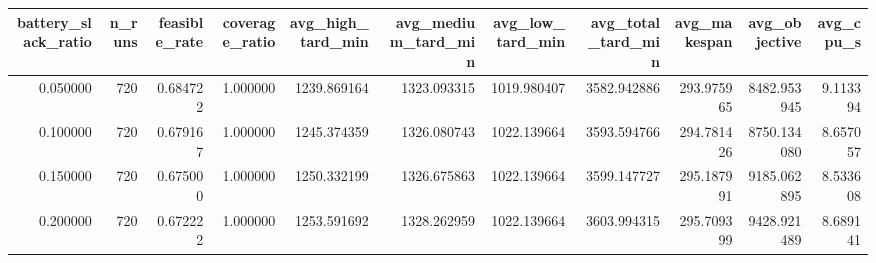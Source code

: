 \begin{tabular}{rrrrrrrrrrr}
\toprule
battery_slack_ratio & n_runs & feasible_rate & coverage_ratio & avg_high_tard_min & avg_medium_tard_min & avg_low_tard_min & avg_total_tard_min & avg_makespan & avg_objective & avg_cpu_s \\
\midrule
0.050000 & 720 & 0.684722 & 1.000000 & 1239.869164 & 1323.093315 & 1019.980407 & 3582.942886 & 293.975965 & 8482.953945 & 9.113394 \\
0.100000 & 720 & 0.679167 & 1.000000 & 1245.374359 & 1326.080743 & 1022.139664 & 3593.594766 & 294.781426 & 8750.134080 & 8.657057 \\
0.150000 & 720 & 0.675000 & 1.000000 & 1250.332199 & 1326.675863 & 1022.139664 & 3599.147727 & 295.187991 & 9185.062895 & 8.533608 \\
0.200000 & 720 & 0.672222 & 1.000000 & 1253.591692 & 1328.262959 & 1022.139664 & 3603.994315 & 295.709399 & 9428.921489 & 8.689141 \\
\bottomrule
\end{tabular}
